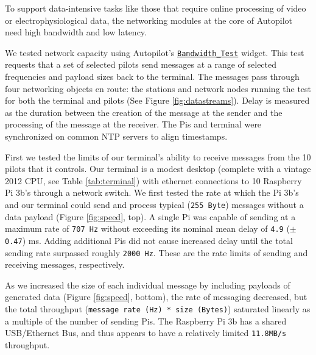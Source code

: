 To support data-intensive tasks like those that require online processing of video or electrophysiological data, the networking modules at the core of Autopilot need high bandwidth and low latency. 

We tested network capacity using Autopilot's \href{http://docs.auto-pi-lot.com/autopilot.core.gui.html#autopilot.core.gui.Bandwidth_Test}{\texttt{Bandwidth\_Test}} widget. This test requests that a set of selected pilots send messages at a range of selected frequencies and payload sizes back to the terminal. The messages pass through four networking objects en route: the stations and network nodes running the test for both the terminal and pilots (See Figure \ref{fig:datastreams}). Delay is measured as the duration between the creation of the message at the sender and the processing of the message at the receiver. The Pis and terminal were synchronized on common NTP servers to align timestamps. 

First we tested the limits of our terminal's ability to receive messages from the 10 pilots that it controls. Our terminal is a modest desktop (complete with a vintage 2012 CPU, see Table \ref{tab:terminal}) with ethernet connections to 10 Raspberry Pi 3b's through a network switch. We first tested the rate at which the Pi 3b's and our terminal could send and process typical (\texttt{255 Byte}) messages without a data payload (Figure \ref{fig:speed}, top). A single Pi was capable of sending at a maximum rate of \texttt{707 Hz} without exceeding its nominal mean delay of \texttt{4.9} ($\pm$ \texttt{0.47}) ms. Adding additional Pis did not cause increased delay until the total sending rate surpassed roughly \texttt{2000 Hz}. These are the rate limits of sending and receiving messages, respectively.

As we increased the size of each individual message by including payloads of generated data (Figure \ref{fig:speed}, bottom), the rate of messaging decreased, but the total throughput (\texttt{message rate (Hz) * size (Bytes)}) saturated linearly as a multiple of the number of sending Pis. The Raspberry Pi 3b has a shared USB/Ethernet Bus, and thus appears to have a relatively limited \texttt{11.8MB/s} throughput.

